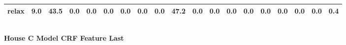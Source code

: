 \documentclass{article}
\begin{document}
\begin{sideways}
\begin{tabular}{lrrrrrrrrrrrrrrrrrr}
relax                         &         9.0 &               43.5 &           0.0 &                          0.0 &                0.0 &                0.0 &                        0.0 &          0.0 &             47.2 &                0.0 &                    0.0 &                      0.0 &                  0.0 &                   0.0 &              0.0 &              0.0 &                                  0.0 &          0.4 \\
\bottomrule
\end{tabular}
\end{sideways}
\normalsize
\vspace{1cm}\\
\textbf{House C Model CRF Feature Last}\\
\vspace{1cm}\\
\end{document}
